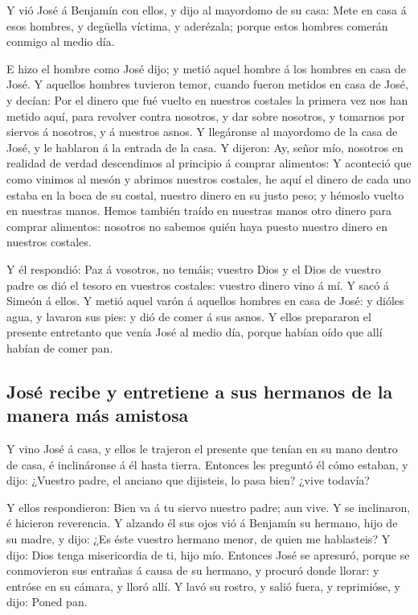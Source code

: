  Y vió José á Benjamín con ellos, y dijo al mayordomo de
su casa: Mete en casa á esos hombres, y degüella víctima, y aderézala;
porque estos hombres comerán conmigo al medio día.

 E hizo el hombre como José dijo; y metió aquel hombre á
los hombres en casa de José.  Y aquellos hombres tuvieron
temor, cuando fueron metidos en casa de José, y decían: Por el dinero
que fué vuelto en nuestros costales la primera vez nos han metido aquí,
para revolver contra nosotros, y dar sobre nosotros, y tomarnos por
siervos á nosotros, y á nuestros asnos.  Y llegáronse al
mayordomo de la casa de José, y le hablaron á la entrada de la casa.
 Y dijeron: Ay, señor mío, nosotros en realidad de verdad
descendimos al principio á comprar alimentos:  Y
aconteció que como vinimos al mesón y abrimos nuestros costales, he aquí
el dinero de cada uno estaba en la boca de su costal, nuestro dinero en
su justo peso; y hémoslo vuelto en nuestras manos.  Hemos
también traído en nuestras manos otro dinero para comprar alimentos:
nosotros no sabemos quién haya puesto nuestro dinero en nuestros
costales.

 Y él respondió: Paz á vosotros, no temáis; vuestro Dios
y el Dios de vuestro padre os dió el tesoro en vuestros costales:
vuestro dinero vino á mí. Y sacó á Simeón á ellos.  Y
metió aquel varón á aquellos hombres en casa de José: y dióles agua, y
lavaron sus pies: y dió de comer á sus asnos.  Y ellos
prepararon el presente entretanto que venía José al medio día, porque
habían oído que allí habían de comer pan.

\hypertarget{josuxe9-recibe-y-entretiene-a-sus-hermanos-de-la-manera-muxe1s-amistosa}{%
\subsection{José recibe y entretiene a sus hermanos de la manera más
amistosa}\label{josuxe9-recibe-y-entretiene-a-sus-hermanos-de-la-manera-muxe1s-amistosa}}

 Y vino José á casa, y ellos le trajeron el presente que
tenían en su mano dentro de casa, é inclináronse á él hasta tierra.
 Entonces les preguntó él cómo estaban, y dijo: ¿Vuestro
padre, el anciano que dijisteis, lo pasa bien? ¿vive todavía?

 Y ellos respondieron: Bien va á tu siervo nuestro padre;
aun vive. Y se inclinaron, é hicieron reverencia.  Y
alzando él sus ojos vió á Benjamín su hermano, hijo de su madre, y dijo:
¿Es éste vuestro hermano menor, de quien me hablasteis? Y dijo: Dios
tenga misericordia de ti, hijo mío.  Entonces José se
apresuró, porque se conmovieron sus entrañas á causa de su hermano, y
procuró donde llorar: y entróse en su cámara, y lloró allí.
 Y lavó su rostro, y salió fuera, y reprimióse, y dijo:
Poned pan.


